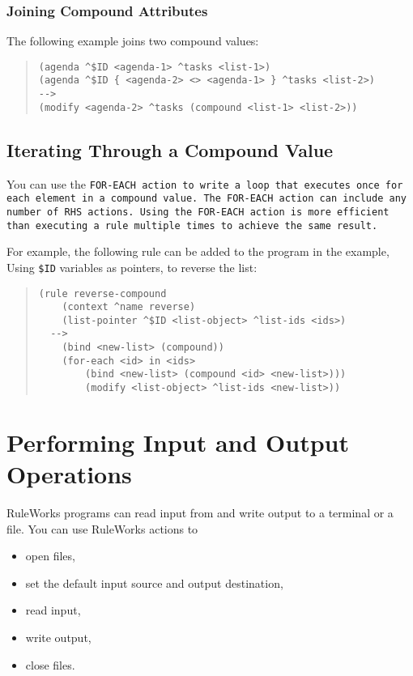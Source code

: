 \subsubsection*{Joining Compound Attributes}

The following example joins two compound values:
\begin{quote}
\begin{verbatim}
(agenda ^$ID <agenda-1> ^tasks <list-1>)
(agenda ^$ID { <agenda-2> <> <agenda-1> } ^tasks <list-2>)
-->
(modify <agenda-2> ^tasks (compound <list-1> <list-2>))
\end{verbatim}
\end{quote}

\subsection{Iterating Through a Compound Value}

You can use the \tt{FOR-EACH} action to write a loop that executes
once for each element in a compound value. The \tt{FOR-EACH} action
can include any number of RHS actions. Using the \tt{FOR-EACH} action
is more efficient than executing a rule multiple times to achieve the
same result.

For example, the following rule can be added to the program in the
example, Using \verb|$ID| variables as pointers, to reverse the list:

\begin{quote}
\begin{verbatim}
(rule reverse-compound
    (context ^name reverse)
    (list-pointer ^$ID <list-object> ^list-ids <ids>)
  -->
    (bind <new-list> (compound))
    (for-each <id> in <ids>
        (bind <new-list> (compound <id> <new-list>)))
        (modify <list-object> ^list-ids <new-list>))
\end{verbatim}
\end{quote}

\section{Performing Input and Output Operations}

RuleWorks programs can read input from and
write output to a terminal or a file. You can
use RuleWorks actions to

\begin{itemize}
\item open files,
\item set the default input source and output destination,
\item read input,
\item write output,
\item close files.
\end{itemize}

